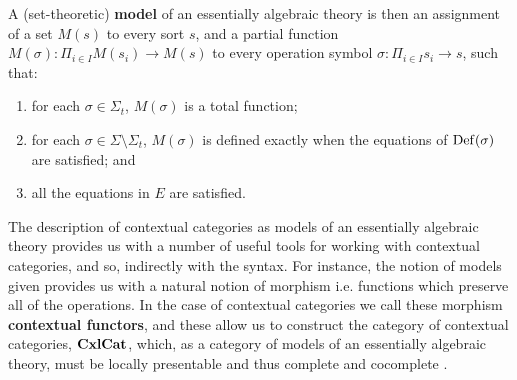 \documentclass{amsart}
\begin{document}
\begin{defn}
    A (set-theoretic) \textbf{model} of an essentially algebraic theory is then an assignment of a set $M(s)$ to every sort $s$, and a partial function $M(\sigma)\colon\Pi_{i\in I}M(s_i)\to M(s)$ to every operation symbol $\sigma\colon\Pi_{i\in I}s_i\to s$, such that:
    \begin{enumerate}
        \item for each $\sigma\in\Sigma_t$, $M(\sigma)$ is a total function;
        \item for each $\sigma\in\Sigma\setminus\Sigma_t$, $M(\sigma)$ is defined exactly when the equations of $\operatorname{Def}(\sigma)$ are satisfied; and
        \item all the equations in $E$ are satisfied.
    \end{enumerate}
\end{defn}

The description of contextual categories as models of an essentially algebraic theory provides us with a number of useful tools for working with contextual categories, and so, indirectly with the syntax. For instance, the notion of models given provides us with a natural notion of morphism i.e. functions which preserve all of the operations. In the case of contextual categories we call these morphism \textbf{contextual functors}, and these allow us to construct the category of contextual categories, $\operatorname{\mathbf{CxlCat}}$, which, as a category of models of an essentially algebraic theory, must be locally presentable and thus complete and cocomplete \cite[Thm. 3.36]{AR}.
\end{document}
